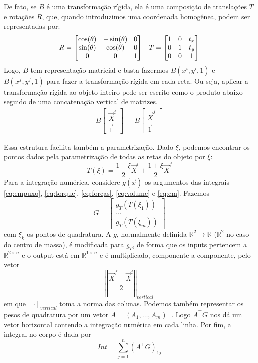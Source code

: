 \documentclass[
	12pt,				%
	oneside,			%
	a4paper,			%
	]{article}
\begin{document}
    De fato, se $B$ é uma transformação rígida, ela é uma composição de translações $T$ e rotações $R$, que, quando introduzimos uma coordenada homogênea, podem ser representadas por:
    \begin{align}
        R = \begin{bmatrix}
            \cos(\theta) & -\sin(\theta) & 0 \\
            \sin(\theta) & \cos(\theta) & 0 \\
            0 & 0 & 1
        \end{bmatrix} && T = \begin{bmatrix}
            1 & 0 & t_x \\
            0 & 1 & t_y \\
            0 & 0 & 1 
        \end{bmatrix} \notag
    \end{align}
    Logo, $B$ tem representação matricial e basta fazermos $B (x^i, y^i, 1)$ e $B (x^f, y^f, 1)$ para fazer a transformação rígida em cada reta. Ou seja, aplicar a transformação rígida ao objeto inteiro pode ser escrito como o produto abaixo seguido de uma concatenação vertical de matrizes.
    \begin{align}
        B \begin{bmatrix}
            \vec{X}^i \\
            \vec{1}
        \end{bmatrix} && B \begin{bmatrix}
            \vec{X}^f \\
            \vec{1}
        \end{bmatrix}
    \end{align}
 
    Essa estrutura facilita também a parametrização. Dado $\xi$, podemos encontrar os pontos dados pela parametrização de todas as retas do objeto por $\xi$:
    \[
        T(\xi) = \frac{1 - \xi}{2} \vec{X}^i + \frac{1 + \xi}{2}\vec{X}^f
    \]
    Para a integração numérica, considere $g(\vec{x})$ os argumentos das integrais \ref{eq:empuxo}, \ref{eq:torque}, \ref{eq:forças}, \ref{eq:volume} e \ref{eq:cm}. Fazemos
    \[
        G= \begin{bmatrix}
            g_T(T(\xi_1)) \\
            \dots \\
            g_T(T(\xi_m))
        \end{bmatrix}
    \] 
    com $\xi_k$ os pontos de quadratura. A $g$, normalmente definida $\mathbb{R}^2 \mapsto \mathbb{R}$ ($\mathbb{R}^2$ no caso do centro de massa), é modificada para $g_T$, de forma que os inputs pertencem a $\mathbb{R}^{2 \times n}$ e o output está em $\mathbb{R}^{1 \times n}$ e é multiplicado, componente a componente, pelo vetor
    \[
        \left\Vert \frac{\vec{X}^f - \vec{X}^i}{2} \right\Vert_{vertical}
    \]
    em que $||\cdot||_{vertical}$ toma a norma das colunas.
    Podemos também representar os pesos de quadratura por um vetor $A=(A_1, \dots, A_m)^\top$. Logo $A^\top G$ nos dá um vetor horizontal contendo a integração numérica em cada linha. Por fim, a integral no corpo é dada por
    \[
        Int = \sum_{j=1}^{n} (A^\top G)_{1j}
    \]
\end{document}
